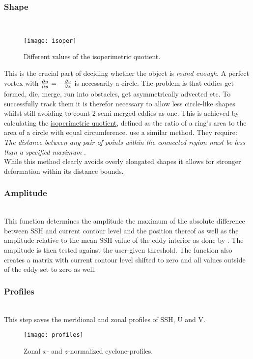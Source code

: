 \subsubsection{Shape}\label{filter:shape}
\\
\begin{wrapfigure}{r}{0.4\textwidth}
	\texttt{[image: isoper]}
	\caption{Different values of the isoperimetric quotient.}
	\label{fig:isoper}
\end{wrapfigure}

This is the crucial part of deciding whether the object is \textit{round
enough}. A perfect vortex with $\frac{\partial u}{\partial y}=-\frac{\partial v}{\partial x}$ is necessarily a
circle. The problem is that eddies get formed, die, merge, run into obstacles,
get asymmetrically advected etc. To successfully track them it is therefor
necessary to allow less circle-like shapes whilst still avoiding to \eg count 2
semi merged eddies as one. 
This is achieved by calculating the \hyperref[def:IQ]{isoperimetric quotient},
defined as the ratio of a ring's area to the area of a circle with equal
circumference. \cite{Chelton2011} use a similar method. They
require:\\ \textit{The distance between any pair of points within the connected
region must be less than a specified maximum} \citep{Chelton2011}.\\
While this method clearly avoids overly elongated shapes it allows for stronger
deformation within its distance bounds. 
\subsubsection{Amplitude} \label{filter:amp}
\\
This function determines the amplitude \ie the maximum of the absolute
difference between SSH and current contour level and the position thereof as
well as the amplitude relative to the mean SSH value of the eddy interior as
done by \cite{Chelton2011}. The
amplitude is then tested against the user-given threshold. The function also
creates a matrix with current contour level shifted to zero and all values
outside of the eddy set to zero as well. 
\subsubsection{Profiles}
\\
This step saves the meridional and zonal profiles of SSH, U and V. 
\begin{wrapfigure}{r}{0.4\textwidth}
	\texttt{[image: profiles]}
	\caption{Zonal $x$- and $z$-normalized cyclone-profiles.}
	\label{fig:profiles}
\end{wrapfigure}

